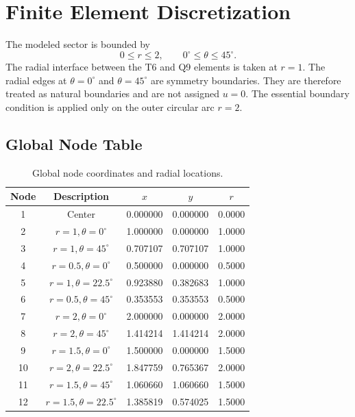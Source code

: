 \documentclass[12pt,a4paper]{article}
\begin{document}
\section{Finite Element Discretization}

The modeled sector is bounded by
\begin{equation}
    0 \leq r \leq 2, \qquad 0^\circ \leq \theta \leq 45^\circ.
\end{equation}
The radial interface between the T6 and Q9 elements is taken at $r=1$. The radial edges at $\theta=0^\circ$ and $\theta=45^\circ$ are symmetry boundaries. They are therefore treated as natural boundaries and are not assigned $u=0$. The essential boundary condition is applied only on the outer circular arc $r=2$.

\subsection{Global Node Table}

\begin{table}[H]
\centering
\caption{Global node coordinates and radial locations.}
\begin{tabular}{c c c c c}
\toprule
Node & Description & $x$ & $y$ & $r$ \\
\midrule
1 & Center & 0.000000 & 0.000000 & 0.0000 \\
2 & $r=1,\theta=0^\circ$ & 1.000000 & 0.000000 & 1.0000 \\
3 & $r=1,\theta=45^\circ$ & 0.707107 & 0.707107 & 1.0000 \\
4 & $r=0.5,\theta=0^\circ$ & 0.500000 & 0.000000 & 0.5000 \\
5 & $r=1,\theta=22.5^\circ$ & 0.923880 & 0.382683 & 1.0000 \\
6 & $r=0.5,\theta=45^\circ$ & 0.353553 & 0.353553 & 0.5000 \\
7 & $r=2,\theta=0^\circ$ & 2.000000 & 0.000000 & 2.0000 \\
8 & $r=2,\theta=45^\circ$ & 1.414214 & 1.414214 & 2.0000 \\
9 & $r=1.5,\theta=0^\circ$ & 1.500000 & 0.000000 & 1.5000 \\
10 & $r=2,\theta=22.5^\circ$ & 1.847759 & 0.765367 & 2.0000 \\
11 & $r=1.5,\theta=45^\circ$ & 1.060660 & 1.060660 & 1.5000 \\
12 & $r=1.5,\theta=22.5^\circ$ & 1.385819 & 0.574025 & 1.5000 \\
\bottomrule
\end{tabular}
\end{table}
\end{document}
